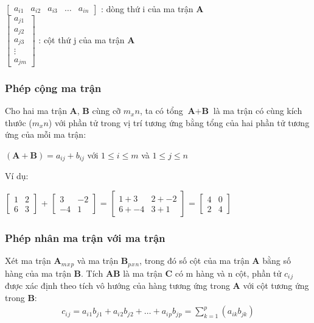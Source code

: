 	\hspace{5mm} 
$	\begin{bmatrix}
		a_{i1} & a_{i2}& a_{i3}&\ldots& a_{in}			
	\end{bmatrix}$ : 
	dòng thứ i của ma trận \textbf{A}\\
	
	\hspace{5mm}
	$\begin{bmatrix}	
		 a_{j1} \\ a_{j2}\\ a_{j3} \\ \vdots \\ a_{jm}		\end{bmatrix}$ : 
	  cột thứ j của ma trận \textbf{A}\\

\subsubsection{Phép cộng ma trận}
\hspace{5mm} Cho hai ma trận \textbf{A}, \textbf{B} cùng cỡ  $ m_x n$, ta có tổng $\textbf{A} + \textbf{B}$ là ma trận có cùng kích thước ($m_x n$) với phần tử trong vị trí tương ứng bằng tổng của hai phần tử tương ứng của mỗi ma trận:
\begin{center}
$(\textbf{A}+\textbf{B}) = a_{ij}+b_{ij}$ với $ 1 \leq i \leq m$ và $1 \leq j \leq n$

\end{center}

Ví dụ:

$\begin{bmatrix}
   1 & 2 \\6 & 3
\end{bmatrix}$
+ 
$\begin{bmatrix}
3 & -2 \\
-4 & 1
\end{bmatrix}$
=
$\begin{bmatrix}
1+3 & 2 + -2 \\
6+-4 & 3+1
\end{bmatrix}$
=
$\begin{bmatrix}
4& 0\\
2 & 4
\end{bmatrix}$


\subsubsection{Phép nhân ma trận với ma trận}
Xét ma trận $\textbf{A}_m{}_x{}_p$ và ma trận \textbf{B}$_p{}_x{}_n$, trong đó số cột của ma trận \textbf{A} bằng số hàng của ma trận \textbf{B}.
\hspace{5mm} Tích \textbf{A}\textbf{B} là ma trận \textbf{C} có m hàng và n cột, phần tử $c_i{}_j$ được xác định theo tích vô hướng của hàng tương ứng trong \textbf{A} với cột tương ứng trong \textbf{B}: 
\begin{align*}
c_i{}_j = a_i{}_1b_j{}_1 + a_i{}_2b_j{}_2 + \ldots + a_i{}_pb_j{}_p=
\sum_{k=1}^p(a_{ik}b_{jk})
\end{align*}

